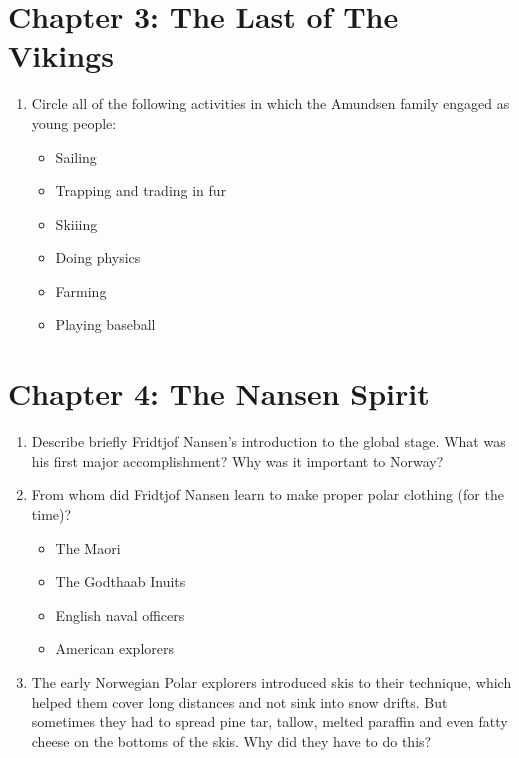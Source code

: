 \documentclass{article}
\begin{document}
\section{Chapter 3: The Last of The Vikings}
\begin{enumerate}
\item Circle all of the following activities in which the Amundsen family engaged as young people:
\begin{itemize}
\item Sailing
\item Trapping and trading in fur
\item Skiiing
\item Doing physics
\item Farming
\item Playing baseball
\end{itemize}
\end{enumerate}

\section{Chapter 4: The Nansen Spirit}
\begin{enumerate}
\item Describe briefly Fridtjof Nansen's introduction to the global stage.  What was his first major accomplishment?  Why was it important to Norway? \\ \vspace{3cm}
\item From whom did Fridtjof Nansen learn to make proper polar clothing (for the time)?
\begin{itemize}
\item The Maori
\item The Godthaab Inuits
\item English naval officers
\item American explorers
\end{itemize}
\item The early Norwegian Polar explorers introduced skis to their technique, which helped them cover long distances and not sink into snow drifts.  But sometimes they had to spread pine tar, tallow, melted paraffin and even fatty cheese on the bottoms of the skis.  Why did they have to do this?
\end{enumerate}
\end{document}
